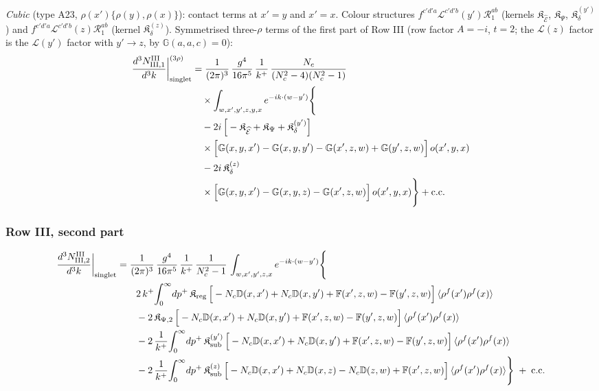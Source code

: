 \documentclass[9pt]{article}
\def\mf#1{\mathbb{#1}}
\numberwithin{equation}{section}
\begin{document}
{\emph{Cubic} (type A23, $\rho(x')\{\rho(y),\rho(x)\}$): contact terms at $x'=y$ and $x'=x$. Colour structures $f^{c'd'a}\mathcal{L}^{c'd'b}(y')\mathcal{R}^{ab}_{1}$ (kernels $\mathfrak{K}_{\widehat{\mathcal{E}}}$, $\mathfrak{K}_{\Psi}$, $\mathfrak{K}_{\delta}^{(y')}$) and $f^{c'd'a}\mathcal{L}^{c'd'b}(z)\mathcal{R}^{ab}_{1}$ (kernel $\mathfrak{K}_{\delta}^{(z)}$).
 Symmetrised three-$\rho$ terms of the first part of Row III (row factor $A=-i$, $t=2$; the $\mathcal{L}(z)$ factor is the $\mathcal{L}(y')$ factor with $y'\to z$, by $\mf{G}(a,a,c)=0$):
\begin{align}
\frac{d^{3}N^{\rm III}_{{\rm III},1}}{d^{3}k}\bigg|^{(3\rho)}_{\rm singlet}&=\frac{1}{(2\pi)^{3}}\,\frac{g^{4}}{16\pi^{5}}\,\frac{1}{k^{+}}\,\frac{N_{c}}{(N_{c}^{2}-4)(N_{c}^{2}-1)}\notag\\
&\quad\times\int_{w,x',y',z,y,x}e^{-ik\cdot(w-y')}\Bigg\{\notag\\
&\quad-2i\,\Big[-\mathfrak{K}_{\widehat{\mathcal{E}}}+\mathfrak{K}_{\Psi}+\mathfrak{K}_{\delta}^{(y')}\Big]\notag\\
&\quad\times\Big[\mf{G}(x,y,x')-\mf{G}(x,y,y')-\mf{G}(x',z,w)+\mf{G}(y',z,w)\Big]\,o(x',y,x)\notag\\
&\quad-2i\,\mathfrak{K}_{\delta}^{(z)}\notag\\
&\quad\times\Big[\mf{G}(x,y,x')-\mf{G}(x,y,z)-\mf{G}(x',z,w)\Big]\,o(x',y,x)\Bigg\}+{\rm c.c.}\label{eq:s-o-III-III-1}
\end{align}

\subsubsection*{Row III, second part}

\begin{align}
\frac{d^{3}N^{\rm III}_{{\rm III},2}}{d^{3}k}\bigg|_{\rm singlet}&=\frac{1}{(2\pi)^{3}}\,\frac{g^{4}}{16\pi^{5}}\,\frac{1}{k^{+}}\,\frac{1}{N_{c}^{2}-1}\,\int_{w,x',y',z,x}e^{-ik\cdot(w-y')}\Bigg\{\notag\\
&\qquad 2\,k^{+}\!\int_{0}^{\infty}\!dp^{+}\,\mathfrak{K}_{\rm reg}\,\Big[-N_{c}\mf{D}(x,x')+N_{c}\mf{D}(x,y')+\mf{F}(x',z,w)-\mf{F}(y',z,w)\Big]\,\langle\rho^{f}(x')\rho^{f}(x)\rangle\notag\\
&\qquad -2\,\mathfrak{K}_{\Psi,2}\,\Big[-N_{c}\mf{D}(x,x')+N_{c}\mf{D}(x,y')+\mf{F}(x',z,w)-\mf{F}(y',z,w)\Big]\,\langle\rho^{f}(x')\rho^{f}(x)\rangle\notag\\
&\qquad -2\,\frac{1}{k^{+}}\!\int_{0}^{\infty}\!dp^{+}\,\mathfrak{K}_{\rm sub}^{(y')}\,\Big[-N_{c}\mf{D}(x,x')+N_{c}\mf{D}(x,y')+\mf{F}(x',z,w)-\mf{F}(y',z,w)\Big]\,\langle\rho^{f}(x')\rho^{f}(x)\rangle\notag\\
&\qquad -2\,\frac{1}{k^{+}}\!\int_{0}^{\infty}\!dp^{+}\,\mathfrak{K}_{\rm sub}^{(z)}\,\Big[-N_{c}\mf{D}(x,x')+N_{c}\mf{D}(x,z)-N_{c}\mf{D}(z,w)+\mf{F}(x',z,w)\Big]\,\langle\rho^{f}(x')\rho^{f}(x)\rangle\Bigg\}\;+\;{\rm c.c.}\label{eq:s-III-III-2}
\end{align}

}
\end{document}
